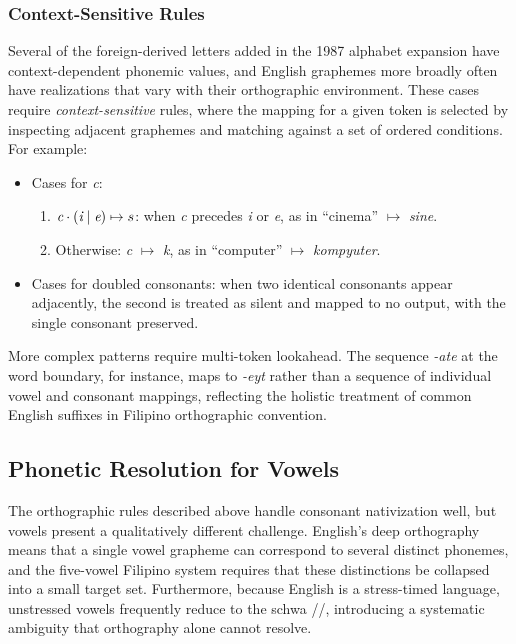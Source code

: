 \subsubsection{Context-Sensitive Rules}
Several of the foreign-derived letters added in the 1987 alphabet expansion
have context-dependent phonemic values, and English graphemes
more broadly often have realizations that vary with their orthographic
environment. These cases require \emph{context-sensitive} rules, where the
mapping for a given token is selected by inspecting adjacent graphemes and
matching against a set of ordered conditions. For example:
\begin{itemize}
      \item Cases for \emph{c}:
            \begin{enumerate}
                  \item \(\emph{c} \cdot (\emph{i} \mid \emph{e}) \mapsto s\):
                        when \emph{c} precedes \emph{i} or \emph{e}, as in
                        ``cinema'' \(\mapsto\) \emph{sine}.
                  \item Otherwise: \emph{c} \( \mapsto \) \emph{k}, as in ``computer'' \(\mapsto\)
                        \emph{kompyuter}.
            \end{enumerate}
      \item Cases for doubled consonants: when two identical consonants appear adjacently, the second is treated as silent and mapped to no
            output, with the single consonant preserved.
\end{itemize}
More complex patterns require multi-token lookahead. The sequence \emph{-ate}
at the word boundary, for instance, maps to \emph{-eyt} rather than a sequence
of individual vowel and consonant mappings, reflecting the holistic treatment of
common English suffixes in Filipino orthographic convention.

\subsection{Phonetic Resolution for Vowels}
The orthographic rules described above handle consonant nativization well, but
vowels present a qualitatively different challenge. 
English's deep orthography means that a single vowel grapheme can correspond to
several distinct phonemes, and the five-vowel Filipino system
requires that these distinctions be collapsed into a small target set.
Furthermore, because English is a stress-timed language, unstressed vowels
frequently reduce to the schwa //, introducing a systematic
ambiguity that orthography alone cannot resolve.

